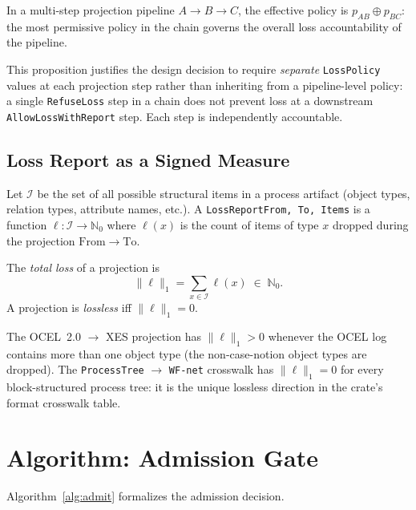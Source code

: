 \begin{proposition}
In a multi-step projection pipeline $A \to B \to C$, the effective policy is
$p_{AB} \oplus p_{BC}$: the most permissive policy in the chain governs the
overall loss accountability of the pipeline.
\end{proposition}

This proposition justifies the design decision to require \emph{separate}
\texttt{LossPolicy} values at each projection step rather than inheriting from
a pipeline-level policy: a single \texttt{RefuseLoss} step in a chain does
not prevent loss at a downstream \texttt{AllowLossWithReport} step. Each step
is independently accountable.

\subsection{Loss Report as a Signed Measure}

Let $\mathcal{I}$ be the set of all possible structural items in a process
artifact (object types, relation types, attribute names, etc.). A
\texttt{LossReport\langle From, To, Items\rangle} is a function
$\ell : \mathcal{I} \to \mathbb{N}_0$ where $\ell(x)$ is the count of items
of type $x$ dropped during the projection $\mathrm{From} \to \mathrm{To}$.

\begin{definition}
The \emph{total loss} of a projection is
\[
  \|\ell\|_1 = \sum_{x \in \mathcal{I}} \ell(x) \;\in\; \mathbb{N}_0.
\]
A projection is \emph{lossless} iff $\|\ell\|_1 = 0$.
\end{definition}

The OCEL~2.0 $\to$ XES projection has $\|\ell\|_1 > 0$ whenever the OCEL log
contains more than one object type (the non-case-notion object types are
dropped). The \texttt{ProcessTree} $\to$ \texttt{WF-net} crosswalk has
$\|\ell\|_1 = 0$ for every block-structured process tree: it is the unique
lossless direction in the crate's format crosswalk table.

\section{Algorithm: Admission Gate}
\label{sec:conc-admit-algo}

Algorithm~\ref{alg:admit} formalizes the admission decision.

